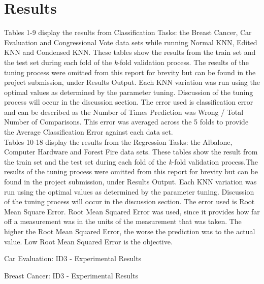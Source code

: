 \documentclass[twoside,11pt]{article}
\begin{document}
\newpage

\section{Results}
Tables 1-9 display the results from Classification Tasks: the Breast Cancer, Car Evaluation and Congressional Vote data sets while running Normal KNN, Edited KNN and Condensed KNN. These tables show the results from the train set and the test set during each fold of the \textit{k}-fold validation process. The results of the tuning process were omitted from this report for brevity but can be found in the project submission, under Results Output. Each KNN variation was run using the optimal values as determined by the parameter tuning. Discussion of the tuning process will occur in the discussion section. The error used is classification error and can be described as the Number of Times Prediction was Wrong / Total Number of Comparisons. This error was averaged across the 5 folds to provide the Average Classification Error against each data set.\\
Tables 10-18 display the results from the Regression Tasks: the Albalone, Computer Hardware and Forest Fire data sets. These tables show the result from the train set and the test set during each fold of the \textit{k}-fold validation process.The results of the tuning process were omitted from this report for brevity but can be found in the project submission, under Results Output. Each KNN variation was run using the optimal values as determined by the parameter tuning. Discussion of the tuning process will occur in the discussion section. The error used is Root Mean Square Error. Root Mean Squared Error was used, since it provides how far off a measurement was in the units of the measurement that was taken. The higher the Root Mean Squared Error, the worse the prediction was to the actual value. Low Root Mean Squared Error is the objective.\newline

\begin{table}[h]
		\centering
		\caption{Car Evaluation: ID3 - Experimental Results}
		\label{tab:table1}
\end{table}

\begin{table}[h]
		\centering
		\caption{Breast Cancer: ID3 - Experimental Results}
		\label{tab:table2}
\end{table}
\end{document}
